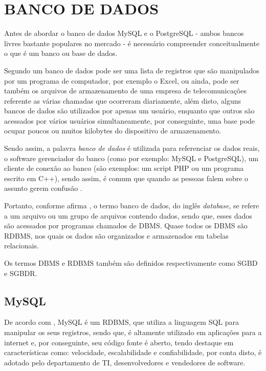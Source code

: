 \section{BANCO DE DADOS}

Antes de abordar o banco de dados \acs{MySQL} e o \acs{PostgreSQL} - ambos
bancos livres bastante populares no mercado - é necessário compreender
conceitualmente o que é um banco ou base de dados.
 
Segundo  um banco de dados pode ser uma
lista de registros que são manipulados por um programa de computador, por
exemplo o \acs{Excel}, ou ainda, pode ser também os arquivos de armazenamento
de uma empresa de telecomunicações referente as várias chamadas que ocorreram
diariamente, além disto, alguns bancos de dados são utilizados por apenas um
usuário, enquanto que outros são acessados por vários usuários
simultaneamente, por conseguinte, uma base pode ocupar poucos ou muitos
kilobytes do dispositivo de armazenamento.

Sendo assim, a palavra \textit{banco de dados} é utilizada para referenciar os
dados reais, o software gerenciador do banco (como por exemplo: \acs{MySQL} e 
\acs{PostgreSQL}), um cliente de conexão ao banco (são exemplos: um script
\acs{PHP} ou um programa escrito em C++), sendo assim, é comum que quando as 
pessoas falem sobre o assunto gerem confusão \cite{theDefinitiveGuideToMySQL5}.

Portanto, conforme afirma , o termo banco de
dados, do inglês \textit{database}, se refere a um arquivo ou um grupo de
arquivos contendo dados, sendo que, esses dados são acessados por programas 
chamados de \ac{DBMS}. Quase todos os \acs{DBMS} são \ac{RDBMS}, nos quais
os dados são organizados e armazenados em tabelas relacionais.

Os termos \acs{DBMS} e \acs{RDBMS} também são definidos respectivamente como
\ac{SGBD} e \ac{SGBDR}.

\subsection{MySQL}

De acordo com , \acs{MySQL} é um
\acs{RDBMS},  que utiliza a linguagem \ac{SQL} para manipular os seus registros, 
sendo que, é altamente utilizado em aplicações para a internet e, por
conseguinte,  seu código fonte é aberto, tendo destaque em características
como: velocidade, escalabilidade e confiabilidade, por conta disto, é adotado
pelo departamento de \ac{TI}, desenvolvedores e vendedores de software.

